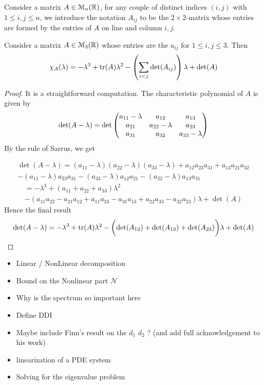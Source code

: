 \begin{definition}
	Consider a matrix $A \in \EuScript{M}_n(\mathbb{R})$, for any couple of distinct indices $(i, j)$ with $1 \le i, j \le n$, we introduce the notation $A_{ij}$ to be the $2 \! \times \! 2$-matrix whose entries are formed by the entries of $A$ on line and column $i, j$.
\end{definition}

\begin{proposition} Consider a matrix $A \in \EuScript{M}_3(\mathbb{R})$ whose entries are the $a_{ij}$ for $1 \le i, j \le 3$. Then 
	$$\chi_A(\lambda) = -\lambda^3 + \mathrm{tr}(A) \lambda^2 - \left( \sum_{i < j} \mathrm{det}(A_{ij})\right) \lambda + \mathrm{det}(A)$$
\end{proposition}

\begin{proof}
	It is a straightforward computation. The characteristic polynomial of $A$ is given by
	$$\mathrm{det}(A-\lambda) = \mathrm{det} \begin{pmatrix}
	a_{11} - \lambda & a_{12} & a_{13} \\
	a_{21} & a_{22} - \lambda & a_{23} \\
	a_{31} & a_{32} & a_{33} - \lambda
	\end{pmatrix}$$
	By the rule of Sarrus, we get 
	
	\begin{multline}
		\det(A - \lambda) = (a_{11} - \lambda)(a_{22} - \lambda)(a_{33} - \lambda) + a_{12} a_{23} a_{31} +  a_{13} a_{21} a_{32} \\ - (a_{11} - \lambda) a_{23} a_{31} - (a_{33} - \lambda) a_{12} a_{21} - (a_{22} - \lambda) a_{13} a_{31} 
	\end{multline}
	\begin{multline}
		= -\lambda^3 + (a_{11} + a_{22} + a_{33}) \lambda^2 \\ - (a_{11} a_{22} - a_{21} a_{12} + a_{11} a_{33} - a_{31} a_{13} + a_{22} a_{33} - a_{32} a_{23}) \lambda + \det(A)
	\end{multline}
Hence the final result
	$$\mathrm{det}(A - \lambda) = - \lambda^3 + \mathrm{tr}(A)\lambda^2 - \biggl(\mathrm{det}(A_{12}) + \mathrm{det}(A_{13}) + \mathrm{det}(A_{23})\biggr)\lambda + \mathrm{det}(A)$$
\end{proof}

\begin{itemize}
    \item Linear / NonLinear decomposition
    \item Bound on the Nonlinear part $\mathcal N$
    
    \item Why is the spectrum so important here
    \item Define DDI
    \item Maybe include Finn's result on the $d_1$ $d_2$ ? (and add full acknowledgement to his work)
    \item linearization of a PDE system
    \item Solving for the eigenvalue problem   
\end{itemize}